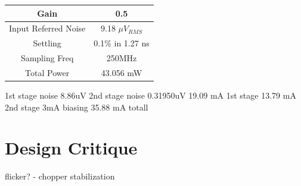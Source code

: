 \documentclass[conference]{IEEEtran}
\begin{document}
\begin{center}
\begin{tabular}{|c|c|} 
\hline
Gain & 0.5 \\
\hline
Input Referred Noise & 9.18 $\mu$$V_{RMS}$ \\
\hline
Settling & 0.1\% in 1.27 ns \\
\hline
Sampling Freq & 250MHz \\
\hline
Total Power & 43.056 mW \\
\hline
\end{tabular}
\end{center}

1st stage noise 8.86uV
2nd stage noise 0.31950uV
19.09 mA 1st stage
13.79 mA 2nd stage
3mA biasing
35.88 mA totall

\section{Design Critique}

flicker? - chopper stabilization
\end{document}

